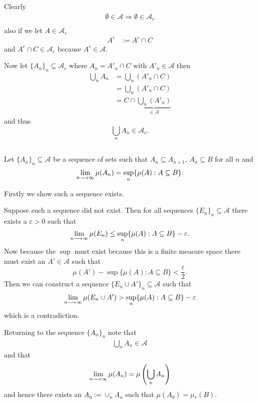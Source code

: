 \documentclass{unswmaths}
\begin{document}
\subsection{}
Clearly
\begin{align*}
    \emptyset \in \mathcal{A} \Longrightarrow \emptyset \in \mathcal{A}_{c} \\
\end{align*}
also if we let $ A \in \mathcal{A}_{c} $
\begin{align*}
    A^{c} &:= A^{c} \cap C
\end{align*}
and $ A^{c} \cap C \in \mathcal{A}_{c} $ because $ A^{c} \in \mathcal{A} $.

Now let $ \{ A_n \}_n \subseteq \mathcal{A}_{c} $ where $ A_n = A'_n \cap C $ with $ A'_n \in \mathcal{A} $ then 
\begin{align*}
    \bigcup_{n} A_n &= \bigcup_{n} (A'_n \cap C) \\
        &= \bigcup_{n} (A'_n \cap C) \\
        &= C \cap \underbrace{\bigcup_{n} (A'_n)}_{\in \mathcal{A}}
\end{align*}
and thus 
$$
    \bigcup_{n} A_n \in \mathcal{A}_{c}.
$$
\subsection{}
Let $ \{ A_n \}_n \subseteq \mathcal{A} $ be a sequence of sets such that $ A_n \subseteq A_{n+1} $, $ A_n \subseteq B $ for all $ n $ and 
$$ \lim_{n \longrightarrow \infty} \mu(A_n) = \sup_{n} \{ \mu(A) : A \subseteq B \}. $$

Firstly we show such a sequence exists.

Suppose such a sequence did not exist. Then for all sequences $ \{E_n\}_n \subseteq \mathcal{A} $ there exists a $ \varepsilon > 0 $ such that
$$ \lim_{n\longrightarrow\infty} \mu(E_n) \leq \sup_n \{ \mu(A) : A \subseteq B \} - \varepsilon. $$ 
Now because the $ \sup $ must exist because this is a finite measure space there must exist an $ A' \in \mathcal{A} $ such that
$$ \mu(A') - \sup\{ \mu(A) : A \subseteq B \} < \frac{\varepsilon}{2}. $$ Then we can construct a sequence $ \{ E_n \cup A' \}_n \subseteq \mathcal{A} $ such that
$$
    \lim_{n\longrightarrow\infty} \mu(E_n \cup A') >  \sup_{n} \{ \mu(A) : A \subseteq B \} - \varepsilon
$$
which is a contradiction.

Returning to the sequence $ \{ A_n \}_n $ note that 
\begin{align*}
    \bigcup_{n} A_n \in \mathcal{A} 
\end{align*} 
and that
\begin{align*}
    \lim_{n\longrightarrow\infty} \mu(A_n) = \mu\left( \bigcup_n A_n \right)    
\end{align*}
and hence there exists an $ A_0 := \cup_{n} A_n $ such that $ \mu(A_0) = \mu_{*}(B) $.
\end{document}
